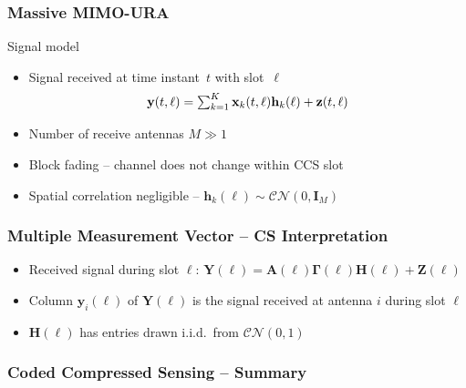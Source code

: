 \begin{frame}
\frametitle{Massive MIMO-URA}
\begin{center}
\scalebox{0.75}{}
\end{center}
\vfill
\begin{block}{Signal model}
\begin{itemize}
\item Signal received at time instant~$t$ with slot~$\ell$
\begin{equation*}
\mathbf{y}(t,\ell) =
\textstyle \sum_{k=1}^K \mathbf{x}_k(t,\ell) \mathbf{h}_k(\ell) + \mathbf{z}(t,\ell)
\end{equation*}
\item Number of receive antennas $M \gg 1$
\item Block fading -- channel does not change within CCS slot
\item Spatial correlation negligible -- $\mathbf{h}_k(\ell) \sim \mathcal{CN}(0,\mathbf{I}_M)$
\end{itemize}
\end{block}
\end{frame}


\begin{frame}
\frametitle{Multiple Measurement Vector -- CS Interpretation}
\centerline{}
\vfill
\begin{itemize}
\item Received signal during slot $\ell$: $\mathbf{Y}(\ell) = \mathbf{A}(\ell)\mathbf{\Gamma}(\ell)\mathbf{H}(\ell) + \mathbf{Z}(\ell)$ 
\item Column $\mathbf{y}_i(\ell)$ of $\mathbf{Y}(\ell)$ is the signal received at antenna $i$ during slot $\ell$
\item $\mathbf{H}(\ell)$ has entries drawn i.i.d.\ from $\mathcal{CN}(0,1)$
\end{itemize}
\end{frame}


\begin{frame}
\frametitle{Coded Compressed Sensing -- Summary}
\begin{center}

\end{center}
\end{frame}

